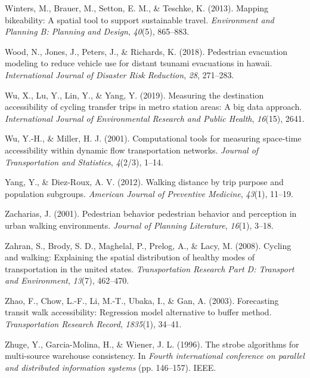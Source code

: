 \documentclass[12pt,twoside]{reedthesis}
\newlength{\cslhangindent}
\newenvironment{CSLReferences}[2] %
 {%
  \setlength{\parindent}{0pt}
  \ifodd #1 \everypar{\setlength{\hangindent}{\cslhangindent}}\ignorespaces\fi
  \ifnum #2 > 0
  \setlength{\parskip}{#2\baselineskip}
  \fi
 }%
 {}
\begin{document}
\begin{CSLReferences}{1}{0}
\leavevmode{}%
Winters, M., Brauer, M., Setton, E. M., \& Teschke, K. (2013). Mapping bikeability: A spatial tool to support sustainable travel. \emph{Environment and Planning B: Planning and Design}, \emph{40}(5), 865--883.

\leavevmode{}%
Wood, N., Jones, J., Peters, J., \& Richards, K. (2018). Pedestrian evacuation modeling to reduce vehicle use for distant tsunami evacuations in hawaii. \emph{International Journal of Disaster Risk Reduction}, \emph{28}, 271--283.

\leavevmode{}%
Wu, X., Lu, Y., Lin, Y., \& Yang, Y. (2019). Measuring the destination accessibility of cycling transfer trips in metro station areas: A big data approach. \emph{International Journal of Environmental Research and Public Health}, \emph{16}(15), 2641.

\leavevmode{}%
Wu, Y.-H., \& Miller, H. J. (2001). Computational tools for measuring space-time accessibility within dynamic flow transportation networks. \emph{Journal of Transportation and Statistics}, \emph{4}(2/3), 1--14.

\leavevmode{}%
Yang, Y., \& Diez-Roux, A. V. (2012). Walking distance by trip purpose and population subgroups. \emph{American Journal of Preventive Medicine}, \emph{43}(1), 11--19.

\leavevmode{}%
Zacharias, J. (2001). Pedestrian behavior pedestrian behavior and perception in urban walking environments. \emph{Journal of Planning Literature}, \emph{16}(1), 3--18.

\leavevmode{}%
Zahran, S., Brody, S. D., Maghelal, P., Prelog, A., \& Lacy, M. (2008). Cycling and walking: Explaining the spatial distribution of healthy modes of transportation in the united states. \emph{Transportation Research Part D: Transport and Environment}, \emph{13}(7), 462--470.

\leavevmode{}%
Zhao, F., Chow, L.-F., Li, M.-T., Ubaka, I., \& Gan, A. (2003). Forecasting transit walk accessibility: Regression model alternative to buffer method. \emph{Transportation Research Record}, \emph{1835}(1), 34--41.

\leavevmode{}%
Zhuge, Y., Garcia-Molina, H., \& Wiener, J. L. (1996). The strobe algorithms for multi-source warehouse consistency. In \emph{Fourth international conference on parallel and distributed information systems} (pp. 146--157). IEEE.


\end{CSLReferences}
\end{document}
